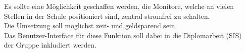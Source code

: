 Es sollte eine Möglichkeit geschaffen werden, die Monitore, welche an vielen Stellen in der Schule positioniert sind, zentral stromfrei zu schalten.\\
Die Umsetzung soll möglichst zeit- und geldsparend sein.\\
Das Benutzer-Interface für diese Funktion soll dabei in die Diplomarbeit (SIS) der Gruppe inkludiert werden.\\